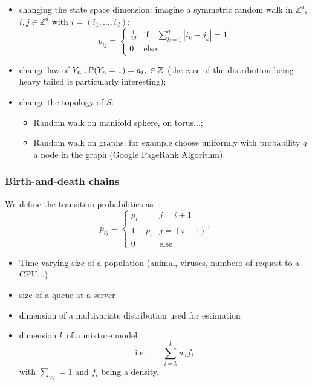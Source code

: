 \documentclass{article}
\begin{document}
\begin{itemize}
    \item changing the state space dimension: imagine a symmetric random walk in $\mathbb{Z}^d$, $i,j \in \mathbb{Z}^d$ with $i=(i_1,\ldots,i_d)$:
    \[
    p_{ij}=\begin{cases}
        \frac{1}{2d} & \text{if}\quad \sum_{k=1}^q|i_k-j_k|=1\\
        0 & \text{else;}
    \end{cases}
    \]
    \item change law of $Y_n:\mathbb{P}(Y_n=1)=a_i, \; \in \mathbb{Z}$ (the case of the distribution being heavy tailed is particularly interesting);
    \item change the topology of $S$:
    \begin{itemize}
        \item Random walk on manifold sphere, on torus...;
        \item Random walk on graphs; for example choose uniformly with probability $q$ a node in the graph (Google PageRank Algorithm).
    \end{itemize}
\end{itemize}
\subsubsection*{Birth-and-death chains}
We define the transition probabilities as
\[
p_{ij}=\begin{cases}
    p_i & j=i+1\\
    1-p_i & j=(i-1)^+\\
    0 &\text{else}
\end{cases}
\]
\begin{figure}[H]
    \centering
    \label{ahah}
\end{figure}
\begin{itemize}
    \item Time-varying size of a population (animal, viruses, numbero of request to a CPU...)
    \item size of a queue at a server
    \item dimension of a multivariate distribution used for estimation
    \item dimension $k$ of a mixture model
    \[
    \text{i.e.} \qquad \sum_{i=k}^k w_i f_i
    \]
    with $\sum_{w_i}=1$ and $f_i$ being a density.
\end{itemize}
\end{document}
